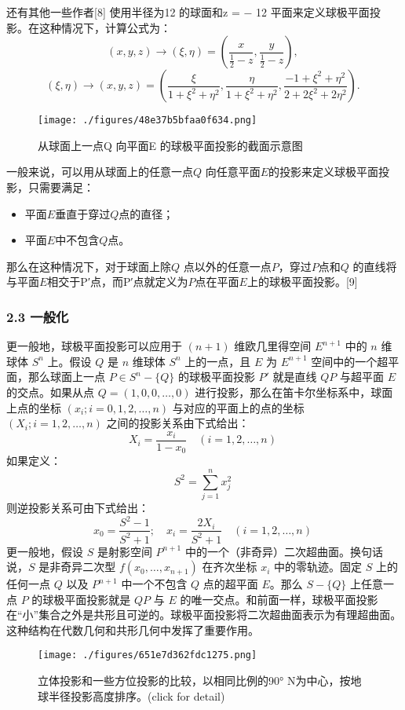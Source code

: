 还有其他一些作者[8] 使用半径为12 的球面和z = − 12 平面来定义球极平面投影。在这种情况下，计算公式为：
$$(x, y, z) \rightarrow (\xi, \eta) = \left( \frac{x}{\frac{1}{2} - z}, \frac{y}{\frac{1}{2} - z} \right),~$$
$$(\xi, \eta) \rightarrow (x, y, z) = \left( \frac{\xi}{1 + \xi^2 + \eta^2}, \frac{\eta}{1 + \xi^2 + \eta^2}, \frac{-1 + \xi^2 + \eta^2}{2 + 2\xi^2 + 2\eta^2} \right).~$$
\begin{figure}[ht]
\centering
\texttt{[image: ./figures/48e37b5bfaa0f634.png]}
\caption{从球面上一点Q 向平面E 的球极平面投影的截面示意图} \label{fig_QJPMTY_4}
\end{figure}
一般来说，可以用从球面上的任意一点$Q$ 向任意平面$E$的投影来定义球极平面投影，只需要满足：
\begin{itemize}
\item 平面$E$垂直于穿过$Q$点的直径；
\item 平面$E$中不包含$Q$点。
\end{itemize}
那么在这种情况下，对于球面上除$Q$ 点以外的任意一点$P$，穿过$P$点和$Q$ 的直线将与平面$E$相交于P′点，而P′点就定义为$P$点在平面$E$上的球极平面投影。[9]
\subsubsection{2.3 一般化}
更一般地，球极平面投影可以应用于 $(n + 1)$ 维欧几里得空间 \(E^{n+1}\) 中的 \(n\) 维球体 \(S^n\) 上。假设 \(Q\) 是 \(n\) 维球体 \(S^n\) 上的一点，且 \(E\) 为 \(E^{n+1}\) 空间中的一个超平面，那么球面上一点 \(P \in S^n - \{Q\}\) 的球极平面投影 \(P'\) 就是直线 \(QP\) 与超平面 \(E\) 的交点。如果从点 \(Q = (1, 0, 0, \ldots, 0)\) 进行投影，那么在笛卡尔坐标系中，球面上点的坐标 \((x_i; i = 0, 1, 2, \ldots, n)\) 与对应的平面上的点的坐标 \((X_i; i = 1, 2, \ldots, n)\) 之间的投影关系由下式给出：
$$X_i = \frac{x_i}{1 - x_0} \quad (i = 1, 2, \ldots, n)~$$
如果定义：
$$S^2 = \sum_{j=1}^n x_j^2~$$
则逆投影关系可由下式给出：
$$x_0 = \frac{S^2 - 1}{S^2 + 1}; \quad x_i = \frac{2X_i}{S^2 + 1} \quad (i = 1, 2, \ldots, n)~$$
更一般地，假设 \(S\) 是射影空间 \(P^{n+1}\) 中的一个（非奇异）二次超曲面。换句话说，\(S\) 是非奇异二次型 \(f(x_0,  \ldots, x_{n+1})\) 在齐次坐标 \(x_i\) 中的零轨迹。固定 \(S\) 上的任何一点 \(Q\) 以及 \(P^{n+1}\) 中一个不包含 \(Q\) 点的超平面 \(E\)。那么 \(S - \{Q\}\) 上任意一点 \(P\) 的球极平面投影就是 \(QP\) 与 \(E\) 的唯一交点。和前面一样，球极平面投影在“小”集合之外是共形且可逆的。球极平面投影将二次超曲面表示为有理超曲面。这种结构在代数几何和共形几何中发挥了重要作用。
\begin{figure}[ht]
\centering
\texttt{[image: ./figures/651e7d362fdc1275.png]}
\caption{立体投影和一些方位投影的比较，以相同比例的90° N为中心，按地球半径投影高度排序。(click for detail)} \label{fig_QJPMTY_5}
\end{figure}

